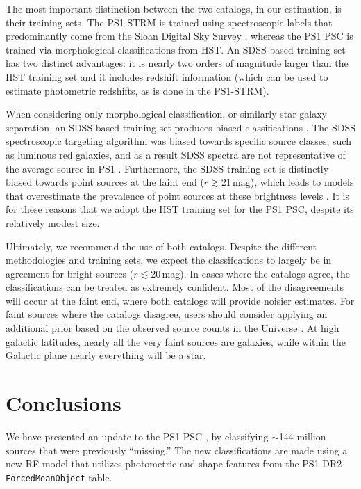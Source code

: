 \documentclass[twocolumn]{aastex63}
\begin{document}
The most important distinction between the two catalogs, in our estimation, is
their training sets. The PS1-STRM is trained using spectroscopic labels that
predominantly come from the Sloan Digital Sky Survey
\citep[SDSS;][]{Abolfathi18}, whereas the PS1 PSC is trained via morphological
classifications from HST. An SDSS-based training set has two distinct
advantages: it is nearly two orders of magnitude larger than the HST training
set and it includes redshift information (which can be used to estimate
photometric redshifts, as is done in the PS1-STRM).

When considering only morphological classification, or similarly star-galaxy
separation, an SDSS-based training set produces biased classifications
\citep{Tachibana18}. The SDSS spectroscopic targeting algorithm was biased
towards specific source classes, such as luminous red galaxies, and as a
result SDSS spectra are not representative of the average source in PS1
\citep[see Figure~1 in][]{Tachibana18}. Furthermore, the SDSS training set is
distinctly biased towards point sources at the faint end ($r \gtrsim
21$\,mag), which leads to models that overestimate the prevalence of point
sources at these brightness levels \citep[see e.g., Figure~7
in][]{Tachibana18}. It is for these reasons that we adopt the HST training set
for the PS1 PSC, despite its relatively modest size.

Ultimately, we recommend the use of both catalogs. Despite the different
methodologies and training sets, we expect the classifcations to largely be in
agreement for bright sources ($r \lesssim 20$\,mag). In cases where the
catalogs agree, the classifications can be treated as extremely confident.
Most of the disagreements will occur at the faint end, where both catalogs
will provide noisier estimates. For faint sources where the catalogs disagree,
users should consider applying an additional prior based on the observed
source counts in the Universe \citep[e.g.,][]{Henrion11}. At high galactic
latitudes, nearly all the very faint sources are galaxies, while within the
Galactic plane nearly everything will be a star.

\section{Conclusions}

We have presented an update to the PS1 PSC \citep{Tachibana18}, by classifying
$\sim$144 million sources that were previously ``missing.'' The new
classifications are made using a new RF model that utilizes photometric and
shape features from the PS1 DR2 \texttt{ForcedMeanObject} table.
\end{document}

